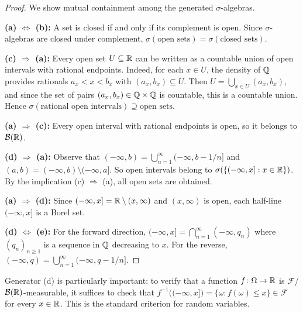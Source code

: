 \documentclass[11pt,a4paper]{article}
\begin{document}
\begin{proof}
We show mutual containment among the generated $\sigma$-algebras.

\textbf{(a) $\Leftrightarrow$ (b):} A set is closed if and only if its
complement is open. Since $\sigma$-algebras are closed under complement,
$\sigma(\text{open sets}) = \sigma(\text{closed sets})$.

\textbf{(c) $\Rightarrow$ (a):} Every open set $U \subseteq \mathbb{R}$ can be
written as a countable union of open intervals with rational endpoints.
Indeed, for each $x \in U$, the density of $\mathbb{Q}$ provides rationals
$a_x < x < b_x$ with $(a_x, b_x) \subseteq U$. Then
$U = \bigcup_{x \in U}(a_x, b_x)$, and since the set of pairs
$(a_x, b_x) \in \mathbb{Q} \times \mathbb{Q}$ is countable, this is a countable union.
Hence $\sigma(\text{rational open intervals}) \supseteq \text{open sets}$.

\textbf{(a) $\Rightarrow$ (c):} Every open interval with rational
endpoints is open, so it belongs to $\mathcal{B}(\mathbb{R})$.

\textbf{(d) $\Rightarrow$ (a):} Observe that
$(-\infty, b) = \bigcup_{n=1}^\infty (-\infty, b - 1/n]$ and
$(a, b) = (-\infty, b) \setminus (-\infty, a]$. So open intervals belong
to $\sigma(\{(-\infty, x] : x \in \mathbb{R}\})$. By the implication
(c) $\Rightarrow$ (a), all open sets are obtained.

\textbf{(a) $\Rightarrow$ (d):} Since
$(-\infty, x] = \mathbb{R} \setminus (x, \infty)$ and $(x, \infty)$ is open,
each half-line $(-\infty, x]$ is a Borel set.

\textbf{(d) $\Leftrightarrow$ (e):} For the forward direction,
$(-\infty, x] = \bigcap_{n=1}^\infty (-\infty, q_n)$ where
$(q_n)_{n \geq 1}$ is a sequence in $\mathbb{Q}$ decreasing to $x$. For the
reverse, $(-\infty, q) = \bigcup_{n=1}^\infty (-\infty, q - 1/n]$.
\end{proof}

\begin{remark}
\label{rem:borel_cdf}
Generator (d) is particularly important: to verify that a function
$f\colon \Omega \to \mathbb{R}$ is $\mathcal{F}$/$\mathcal{B}(\mathbb{R})$-measurable, it
suffices to check that
$f^{-1}\bigl((-\infty, x]\bigr) = \{\omega : f(\omega) \leq x\}
\in \mathcal{F}$ for every $x \in \mathbb{R}$. This is the standard criterion
for random variables.
\end{remark}

\end{document}

